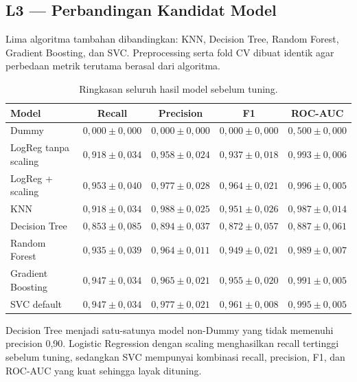 \documentclass[11pt,a4paper]{article}
\begin{document}
\subsection{L3 --- Perbandingan Kandidat Model}

Lima algoritma tambahan dibandingkan: KNN, Decision Tree, Random Forest, Gradient Boosting, dan SVC. Preprocessing serta fold CV dibuat identik agar perbedaan metrik terutama berasal dari algoritma.

\begin{table}[ht]
\centering
\small
\caption{Ringkasan seluruh hasil model sebelum tuning.}
\begin{tabular}{lcccc}
\toprule
Model & Recall & Precision & F1 & ROC-AUC \\
\midrule
Dummy & $0{,}000 \pm 0{,}000$ & $0{,}000 \pm 0{,}000$ & $0{,}000 \pm 0{,}000$ & $0{,}500 \pm 0{,}000$ \\
LogReg tanpa scaling & $0{,}918 \pm 0{,}034$ & $0{,}958 \pm 0{,}024$ & $0{,}937 \pm 0{,}018$ & $0{,}993 \pm 0{,}006$ \\
LogReg + scaling & $0{,}953 \pm 0{,}040$ & $0{,}977 \pm 0{,}028$ & $0{,}964 \pm 0{,}021$ & $0{,}996 \pm 0{,}005$ \\
KNN & $0{,}918 \pm 0{,}034$ & $0{,}988 \pm 0{,}025$ & $0{,}951 \pm 0{,}026$ & $0{,}987 \pm 0{,}014$ \\
Decision Tree & $0{,}853 \pm 0{,}085$ & $0{,}894 \pm 0{,}037$ & $0{,}872 \pm 0{,}057$ & $0{,}887 \pm 0{,}061$ \\
Random Forest & $0{,}935 \pm 0{,}039$ & $0{,}964 \pm 0{,}011$ & $0{,}949 \pm 0{,}021$ & $0{,}989 \pm 0{,}007$ \\
Gradient Boosting & $0{,}947 \pm 0{,}034$ & $0{,}965 \pm 0{,}021$ & $0{,}955 \pm 0{,}020$ & $0{,}991 \pm 0{,}005$ \\
SVC default & $0{,}947 \pm 0{,}034$ & $0{,}977 \pm 0{,}021$ & $0{,}961 \pm 0{,}008$ & $0{,}995 \pm 0{,}005$ \\
\bottomrule
\end{tabular}
\end{table}

Decision Tree menjadi satu-satunya model non-Dummy yang tidak memenuhi precision 0,90. Logistic Regression dengan scaling menghasilkan recall tertinggi sebelum tuning, sedangkan SVC mempunyai kombinasi recall, precision, F1, dan ROC-AUC yang kuat sehingga layak dituning.
\end{document}
